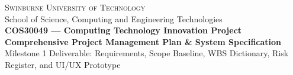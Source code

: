 \documentclass[11pt, a4paper]{article}
\begin{document}
\thispagestyle{empty}

\begin{tcolorbox}[
  enhanced,
  colback=brandNavy,
  colframe=brandNavy,
  arc=4pt,
  boxrule=0pt,
  left=14pt, right=14pt, top=14pt, bottom=14pt
]
  \centering
  {\color{white}\scshape\large Swinburne University of Technology}\\[2pt]
  {\color{white!80}\small School of Science, Computing and Engineering Technologies}\\[8pt]
  {\color{white}\bfseries\LARGE COS30049 --- Computing Technology Innovation Project}\\[6pt]
  {\color{white!95}\Large\textbf{Comprehensive Project Management Plan \& System Specification}}\\[4pt]
  {\color{white!80}\small Milestone 1 Deliverable: Requirements, Scope Baseline, WBS Dictionary, Risk Register, and UI/UX Prototype}
\end{tcolorbox}

\vspace{0.25cm}
\end{document}
